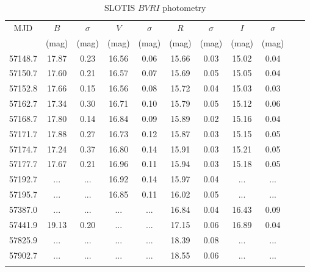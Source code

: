 \documentclass[fleqn,usenatbib,useAMS]{mnras}
\begin{document}
\begin{table*}\begin{center}\begin{minipage}{4.25in}
      \caption{SLOTIS $BVRI$ photometry}
\centering
\small
\begin{tabular}{@{}ccccccccccc}\hline\hline
MJD & $B$ & $\sigma$ & $V$  & $\sigma$ & $R$ & $\sigma$ & $I$ &$\sigma$ \\
  &(mag) &(mag) &(mag) &(mag) &(mag) &(mag) &(mag) &(mag) \\
\hline
57148.7 &17.87 &0.23  &16.56 &0.06  &15.66 &0.03  &15.02  &0.04 \\
57150.7 &17.60 &0.21  &16.57 &0.07  &15.69 &0.05  &15.05  &0.04 \\
57152.8 &17.66 &0.15  &16.56 &0.08  &15.72 &0.04  &15.03  &0.03 \\
57162.7 &17.34 &0.30  &16.71 &0.10  &15.79 &0.05  &15.12  &0.06 \\
57168.7 &17.80 &0.14  &16.84 &0.09  &15.89 &0.02  &15.16  &0.04 \\
57171.7 &17.88 &0.27  &16.73 &0.12  &15.87 &0.03  &15.15  &0.05 \\
57174.7 &17.24 &0.37  &16.80 &0.14  &15.91 &0.03  &15.21  &0.05 \\
57177.7 &17.67 &0.21  &16.96 &0.11  &15.94 &0.03  &15.18  &0.05 \\
57192.7 &...   &...   &16.92 &0.14  &15.97 &0.04  &...    &... \\
57195.7 &...   &...   &16.85 &0.11  &16.02 &0.05  &...    &... \\
57387.0 &...   &...   &...   &...   &16.84 &0.04  &16.43  &0.09 \\
57441.9 &19.13 &0.20  &...   &...   &17.15 &0.06  &16.89  &0.04 \\
57825.9	&...   &...   &...   &...   &18.39 &0.08  &...    &... \\
57902.7	&...   &...   &...   &...   &18.55 &0.06  &...    &... \\
\hline \\
\end{tabular}
\label{tab:slotis}
\end{minipage}\end{center}
\end{table*}



\end{document}

